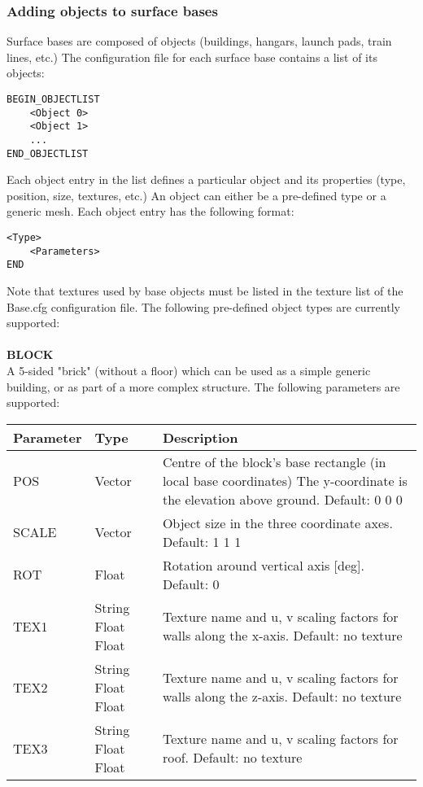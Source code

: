\documentclass[Orbiter Developer Manual.tex]{subfiles}
\begin{document}
\subsubsection*{Adding objects to surface bases}
Surface bases are composed of objects (buildings, hangars, launch pads, train lines, etc.) The configuration file for each surface base contains a list of its objects:

\begin{lstlisting}[language=OSFS]
BEGIN_OBJECTLIST
	<Object 0>
	<Object 1>
	...
END_OBJECTLIST
\end{lstlisting}

\noindent
Each object entry in the list defines a particular object and its properties (type, position, size, textures, etc.) An object can either be a pre-defined type or a generic mesh. Each object entry has the following format:

\begin{lstlisting}[language=OSFS]
<Type>
	<Parameters>
END
\end{lstlisting}

\noindent
Note that textures used by base objects must be listed in the texture list of the Base.cfg configuration file.
The following pre-defined object types are currently supported:\\
\\
\textbf{BLOCK}\\
A 5-sided "brick" (without a floor) which can be used as a simple generic building, or as part of a more complex structure. The following parameters are supported:

	\begin{longtable}{ |p{}|p{}|p{}| }
	\hline\rule{0pt}{2ex}
	\textbf{Parameter} & \textbf{Type} & \textbf{Description}\\
	\hline\rule{0pt}{2ex}
	POS & Vector & Centre of the block's base rectangle (in local base coordinates) The y-coordinate is the elevation above ground. Default: 0 0 0\\
	\hline\rule{0pt}{2ex}
	SCALE & Vector & Object size in the three coordinate axes. Default: 1 1 1\\
	\hline\rule{0pt}{2ex}
	ROT & Float & Rotation around vertical axis [deg]. Default: 0\\
	\hline\rule{0pt}{2ex}
	TEX1 & String Float Float & Texture name and u, v scaling factors for walls along the x-axis. Default: no texture\\
	\hline\rule{0pt}{2ex}
	TEX2 & String Float Float & Texture name and u, v scaling factors for walls along the z-axis. Default: no texture\\
	\hline\rule{0pt}{2ex}
	TEX3 & String Float Float & Texture name and u, v scaling factors for roof. Default: no texture\\
	\hline
	\end{longtable}
\end{document}
